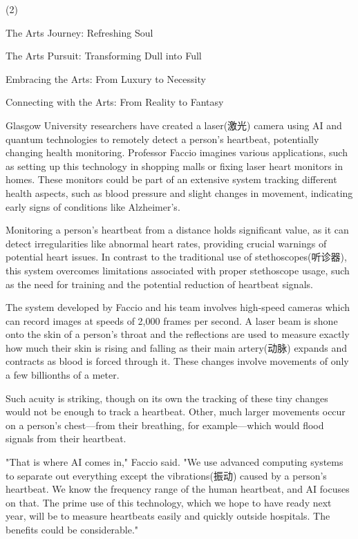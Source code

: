 \documentclass{英语试卷}
\begin{document}
\begin{choices}(2)
  \item The Arts Journey: Refreshing Soul
  \item The Arts Pursuit: Transforming Dull into Full
  \item Embracing the Arts: From Luxury to Necessity
  \item Connecting with the Arts: From Reality to Fantasy
\end{choices}
\par Glasgow University researchers have created a laser(激光) camera using AI and quantum technologies to remotely detect a person's heartbeat, potentially changing health monitoring. Professor Faccio imagines various applications, such as setting up this technology in shopping malls or fixing laser heart monitors in homes. These monitors could be part of an extensive system tracking different health aspects, such as blood pressure and slight changes in movement, indicating early signs of conditions like Alzheimer's.\par
\par Monitoring a person's heartbeat from a distance holds significant value, as it can detect irregularities like abnormal heart rates, providing crucial warnings of potential heart issues. In contrast to the traditional use of stethoscopes(听诊器), this system overcomes limitations associated with proper stethoscope usage, such as the need for training and the potential reduction of heartbeat signals.\par
\par The system developed by Faccio and his team involves high-speed cameras which can record images at speeds of 2,000 frames per second. A laser beam is shone onto the skin of a person's throat and the reflections are used to measure exactly how much their skin is rising and falling as their main artery(动脉) expands and contracts as blood is forced through it. These changes involve movements of only a few billionths of a meter.\par
\par Such acuity is striking, though on its own the tracking of these tiny changes would not be enough to track a heartbeat. Other, much larger movements occur on a person's chest—from their breathing, for example—which would flood signals from their heartbeat.\par
\par "That is where AI comes in," Faccio said. "We use advanced computing systems to separate out everything except the vibrations(振动) caused by a person’s heartbeat. We know the frequency range of the human heartbeat, and AI focuses on that. The prime use of this technology, which we hope to have ready next year, will be to measure heartbeats easily and quickly outside hospitals. The benefits could be considerable."\par
\end{document}
